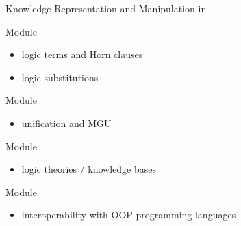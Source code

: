 \documentclass[presentation]{beamer}\mode<presentation>{\usetheme{AMSBolognaFC}}
\begin{document}
\begin{frame}{Knowledge Representation and Manipulation in \twopkt}
    \begin{block}{Module }
        \begin{multicols}{2}
            \begin{itemize}
                \item logic terms and Horn clauses
                \item logic substitutions
            \end{itemize}
        \end{multicols}
    \end{block}

    \begin{block}{Module }
        \begin{itemize}
            \item unification and MGU
        \end{itemize}
    \end{block}

    \begin{block}{Module }
        \begin{itemize}
            \item logic theories / knowledge bases
        \end{itemize}
    \end{block}

    \begin{block}{Module }
        \begin{itemize}
            \item interoperability with OOP programming languages
        \end{itemize}
    \end{block}
\end{frame}

\end{document}

